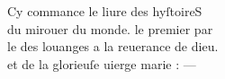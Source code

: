 \documentclass[12pt,varwidth]{standalone}
\begin{document}
{C}{y} commance le liure des h{y}ſtoire{S} \\
du mirouer du monde. le {premier} {pa}r \\
le des louanges a la reuerance de dieu. \\
et de la {glorieuſe} uierge marie : —
\end{document}
